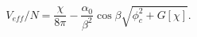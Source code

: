 \begin{equation}
V_{eff}/N  = \frac{\chi}{8 \pi} - \frac {\alpha_0} {\beta^2} \cos \beta
\sqrt{\phi_c^2 + G[\chi]}.
\end{equation}

